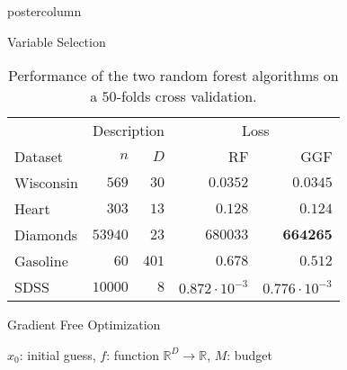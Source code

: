 \documentclass[dvipsnames]{beamer}
\DeclareMathOperator*{\argmin}{arg\,min}
\begin{document}
\begin{frame}
\begin{columns}
\begin{column}{.5\textwidth}
\begin{beamercolorbox}[center]{postercolumn}
\begin{minipage}{.98\textwidth}
{\begin{myblock}{Variable Selection}
\begin{table}[H]
\begin{tabular}{lrrrr}
                                & \multicolumn{2}{c}{Description} & \multicolumn{2}{c}{Loss} \\
                                \cmidrule(l){2-3} \cmidrule(l){4-5}
                                Dataset & $n$ & $D$ & RF & GGF \\
                                \midrule
                                Wisconsin & $569$ & $30$ & $0.0352$ & $\mathbf{0.0345}$ \\
                                Heart & $303$ & $13$ & $0.128$ & $\mathbf{0.124}$ \\
                                Diamonds & $53940$ & $23$ & $680033$ & $\mathbf{664265}$ \\
                                Gasoline & $60$ & $401$ & $0.678$ & $\mathbf{0.512}$ \\
                                SDSS & $10000$ & $8$ & $0.872\cdot 10^{-3}$  & $\mathbf{0.776}\cdot 10^{-3}$ \\
                                \bottomrule
                            \end{tabular}
                            \caption{Performance of the two random forest algorithms on a $50$-folds cross validation.}\label{table:results}
                        \end{table}
                    \end{myblock}
					\begin{myblock}{Gradient Free Optimization}
                        \begin{algorithm}[H]
                            \caption{Estimated Gradient Descent}\label{alg:lolamin}
                            \begin{algorithmic}[1] %
                                \Require $x_0$: initial guess, $f$: function $\mathbb{R}^D \to \mathbb{R}$, $M$: budget
                                    \State{$x \gets \argmin_{X_i} \{ f(X_i) \}$}

\end{algorithmic}
\end{algorithm}
\end{myblock}}
\end{minipage}
\end{beamercolorbox}
\end{column}
\end{columns}
\end{frame}
\end{document}
